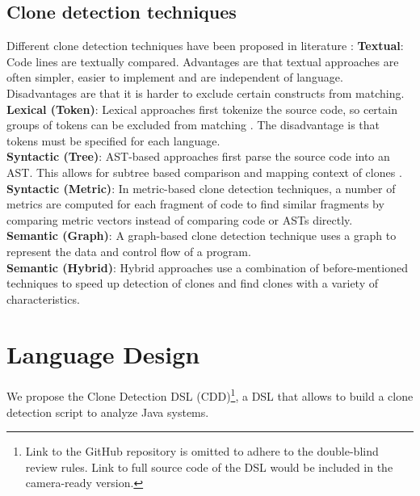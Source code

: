 \documentclass[sigplan,10pt,review,anonymous]{acmart}
\begin{document}
\subsection{Clone detection techniques}
Different clone detection techniques have been proposed in literature \cite{sheneamer2016survey}:
\textbf{Textual}: Code lines are textually compared. Advantages are that textual approaches are often simpler, easier to implement and are independent of language. Disadvantages are that it is harder to exclude certain constructs from matching.
\\ \textbf{Lexical (Token)}: Lexical approaches first tokenize the source code, so certain groups of tokens can be excluded from matching \cite{svajlenko2014evaluating}. The disadvantage is that tokens must be specified for each language.
\\ \textbf{Syntactic (Tree)}: AST-based approaches first parse the source code into an AST. This allows for subtree based comparison and mapping context of clones \cite{fontana2015duplicated}.
\\ \textbf{Syntactic (Metric)}: In metric-based clone detection techniques, a number of metrics are computed for each fragment of code to find similar fragments by comparing metric vectors instead of comparing code or ASTs directly.
\\ \textbf{Semantic (Graph)}: A graph-based clone detection technique uses a graph to represent the data and control flow of a program.
\\ \textbf{Semantic (Hybrid)}: Hybrid approaches use a combination of before-mentioned techniques to speed up detection of clones and find clones with a variety of characteristics.


\section{Language Design}
We propose the Clone Detection DSL (CDD)\footnote{Link to the GitHub repository is omitted to adhere to the double-blind review rules. Link to full source code of the DSL would be included in the camera-ready version.}, a DSL that allows to build a clone detection script to analyze Java systems.
\end{document}
